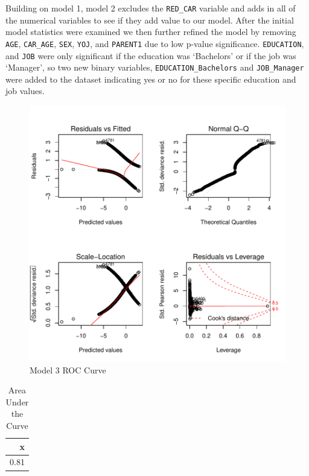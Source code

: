 \documentclass[]{article}
\begin{document}
Building on model 1, model 2 excludes the \texttt{RED\_CAR} variable and
adds in all of the numerical variables to see if they add value to our
model. After the initial model statistics were examined we then further
refined the model by removing \texttt{AGE}, \texttt{CAR\_AGE},
\texttt{SEX}, \texttt{YOJ}, and \texttt{PARENT1} due to low p-value
significance. \texttt{EDUCATION}, and \texttt{JOB} were only significant
if the education was `Bachelors' or if the job was `Manager', so two new
binary variables, \texttt{EDUCATION\_Bachelors} and
\texttt{JOB\_Manager} were added to the dataset indicating yes or no for
these specific education and job values.

\begin{figure}
\centering
\includegraphics{proj4_files/figure-latex/f12-1.pdf}
\caption{\label{fig:f12}Model 3 ROC Curve}
\end{figure}

\begin{table}

\caption{\label{tab:t7}Area Under the Curve}
\centering
\begin{tabular}[t]{r}
\hline
x\\
\hline
0.81\\
\hline
\end{tabular}
\end{table}
\end{document}
